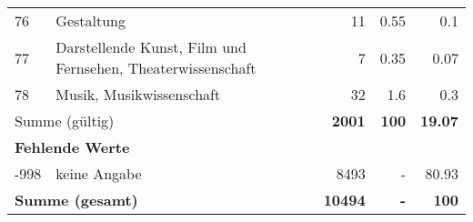 \begin{longtable}{lXrrr}
        76 & \multicolumn{1}{X}{Gestaltung} & %
          \num{11} &
          \num[round-mode=places,round-precision=2]{0,55} &
          \num[round-mode=places,round-precision=2]{0,1} \\

        77 & \multicolumn{1}{X}{Darstellende Kunst, Film und Fernsehen, Theaterwissenschaft} & %
          \num{7} &
          \num[round-mode=places,round-precision=2]{0,35} &
          \num[round-mode=places,round-precision=2]{0,07} \\

        78 & \multicolumn{1}{X}{Musik, Musikwissenschaft} & %
          \num{32} &
          \num[round-mode=places,round-precision=2]{1,6} &
          \num[round-mode=places,round-precision=2]{0,3} \\

     \midrule
     \multicolumn{2}{l}{Summe (gültig)} &
       \textbf{\num{2001}} &
     \textbf{100} &
       \textbf{\num[round-mode=places,round-precision=2]{19,07}} \\
     \multicolumn{5}{l}{\textbf{Fehlende Werte}}\\
       -998 &
       keine Angabe &
         \num{8493} &
        - &
         \num[round-mode=places,round-precision=2]{80,93} \\
     \midrule
     \multicolumn{2}{l}{\textbf{Summe (gesamt)}} &
          \textbf{\num{10494}} &
        \textbf{-} &
        \textbf{100} \\
     \bottomrule
     \end{longtable}
     
